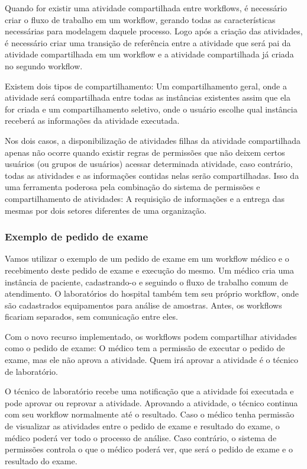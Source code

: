 Quando for existir uma atividade compartilhada entre workflows, é necessário criar o fluxo de trabalho em um workflow, gerando todas as características necessárias para modelagem daquele processo. Logo após a criação das atividades, é necessário criar uma transição de referência entre a atividade que será pai da atividade compartilhada em um workflow e a atividade compartilhada já criada no segundo workflow.

Existem dois tipos de compartilhamento: Um compartilhamento geral, onde a atividade será compartilhada entre todas as instâncias existentes assim que ela for criada e um compartilhamento seletivo, onde o usuário escolhe qual instância receberá as informações da atividade executada.

Nos dois casos, a disponibilização de atividades filhas da atividade compartilhada apenas não ocorre quando existir regras de permissões que não deixem certos usuários (ou grupos de usuários) acessar determinada atividade, caso contrário, todas as atividades e as informações contidas nelas serão compartilhadas.
Isso da uma ferramenta poderosa pela combinação do sistema de permissões e compartilhamento de atividades: A requisição de informações e a entrega das mesmas por dois setores diferentes de uma organização.

\subsubsection{Exemplo de pedido de exame}

Vamos utilizar o exemplo de um pedido de exame em um workflow médico e o recebimento deste pedido de exame e execução do mesmo.
Um médico cria uma instância de paciente, cadastrando-o e seguindo o fluxo de trabalho comum de atendimento.
O laboratórios do hospital também tem seu próprio workflow, onde são cadastrados equipamentos para análise de amostras.
Antes, os workflows ficariam separados, sem comunicação entre eles.

Com o novo recurso implementado, os workflows podem compartilhar atividades como o pedido de exame: O médico tem a permissão de executar o pedido de exame, mas ele não aprova a atividade. Quem irá aprovar a atividade é o técnico de laboratório.

O técnico de laboratório recebe uma notificação que a atividade foi executada e pode aprovar ou reprovar a atividade.
Aprovando a atividade, o técnico continua com seu workflow normalmente até o resultado.
Caso o médico tenha permissão de visualizar as atividades entre o pedido de exame e resultado do exame, o médico poderá ver todo o processo de análise.
Caso contrário, o sistema de permissões controla o que o médico poderá ver, que será o pedido de exame e o resultado do exame.

